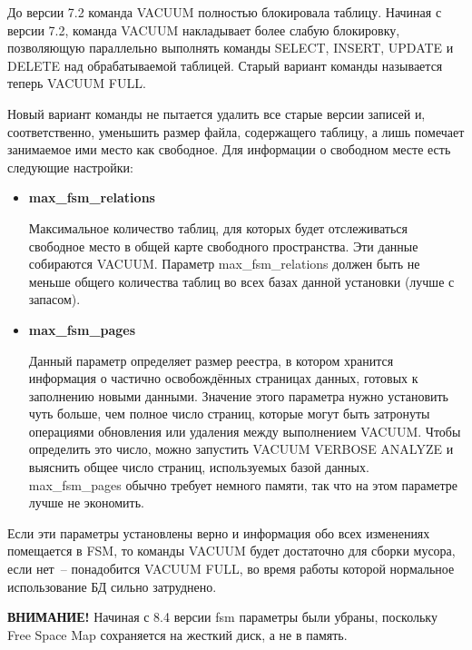 До версии 7.2 команда VACUUM полностью блокировала таблицу. Начиная с версии 7.2, команда VACUUM накладывает более слабую 
блокировку, позволяющую параллельно выполнять команды SELECT, INSERT, UPDATE и DELETE над обрабатываемой таблицей. 
Старый вариант команды называется теперь VACUUM FULL.

Новый вариант команды не пытается удалить все старые версии записей и, соответственно, уменьшить размер файла, содержащего таблицу, 
а лишь помечает занимаемое ими место как свободное. Для информации о свободном месте есть следующие настройки:
\begin{itemize}
\item \textbf{max\_fsm\_relations}

Максимальное количество таблиц, для которых будет отслеживаться свободное место в общей карте свободного пространства. 
Эти данные собираются VACUUM. Параметр max\_fsm\_relations должен быть не меньше общего количества таблиц во всех 
базах данной установки (лучше с запасом). 

\item \textbf{max\_fsm\_pages}

Данный параметр определяет размер реестра, в котором хранится информация о частично освобождённых страницах данных, 
готовых к заполнению новыми данными. Значение этого параметра нужно установить чуть больше, чем полное число страниц, 
которые могут быть затронуты 
операциями обновления или удаления между выполнением VACUUM. Чтобы определить это число, можно запустить VACUUM VERBOSE ANALYZE 
и выяснить общее число страниц, используемых базой данных. max\_fsm\_pages обычно требует немного памяти, так что на этом 
параметре лучше не экономить. 
\end{itemize}

Если эти параметры установлены верно и информация обо всех изменениях помещается в FSM, 
то команды VACUUM будет достаточно для сборки мусора, если нет~-- понадобится
VACUUM FULL, во время работы которой нормальное использование БД сильно затруднено.

\textbf{ВНИМАНИЕ!} Начиная с 8.4 версии fsm параметры были убраны, поскольку Free Space Map сохраняется на жесткий диск, а не в память.

